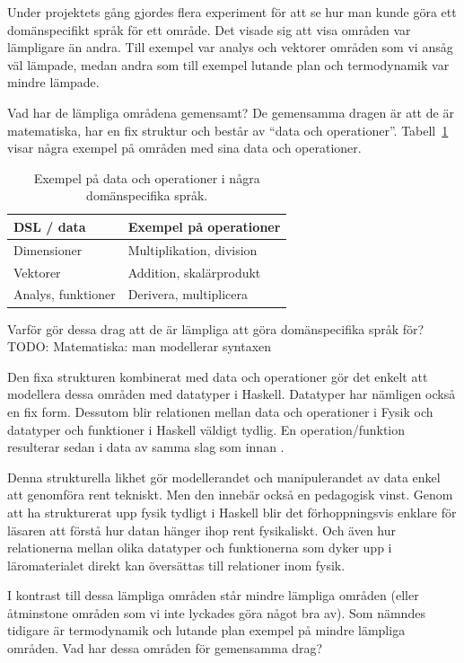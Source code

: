 \begin{binge}
Under projektets gång gjordes flera experiment för att se hur man kunde göra ett domänspecifikt språk för ett område. Det visade sig att visa områden var lämpligare än andra. Till exempel var analys och vektorer områden som vi ansåg väl lämpade, medan andra som till exempel lutande plan och termodynamik var mindre lämpade.

Vad har de lämpliga områdena gemensamt? De gemensamma dragen är att de är
matematiska, har en fix struktur och består av ``data och operationer''.
Tabell~\ref{tab:data_och_ops} visar några exempel på områden med sina data och
operationer.

\begin{table}[tph]
\centering
\caption{Exempel på data och operationer i några domänspecifika språk.}
\label{tab:data_och_ops}
\begin{tabular}{@{}l|l@{}}
\toprule
DSL / data & Exempel på operationer \\ \midrule
Dimensioner & Multiplikation, division \\
Vektorer & Addition, skalärprodukt \\
Analys, funktioner & Derivera, multiplicera \\ \bottomrule
\end{tabular}
\end{table}

Varför gör dessa drag att de är lämpliga att göra domänspecifika språk för?
TODO: Matematiska: man modellerar syntaxen

Den fixa strukturen kombinerat med data och operationer gör det enkelt att
modellera dessa områden med datatyper i Haskell. Datatyper har nämligen också en
fix form. Dessutom blir relationen mellan data och operationer i Fysik och
datatyper och funktioner i Haskell väldigt tydlig. En operation/funktion
resulterar sedan i data av samma slag som innan .

Denna strukturella likhet gör modellerandet och manipulerandet av data enkel att
genomföra rent tekniskt. Men den innebär också en pedagogisk vinst. Genom att ha
strukturerat upp fysik tydligt i Haskell blir det förhoppningsvis enklare för
läsaren att förstå hur datan hänger ihop rent fysikaliskt. Och även hur
relationerna mellan olika datatyper och funktionerna som dyker upp i
läromaterialet direkt kan översättas till relationer inom fysik.

I kontrast till dessa lämpliga områden står mindre lämpliga områden (eller
åtminstone områden som vi inte lyckades göra något bra av). Som nämndes tidigare
är termodynamik och lutande plan exempel på mindre lämpliga områden. Vad har
dessa områden för gemensamma drag?


\end{binge}
